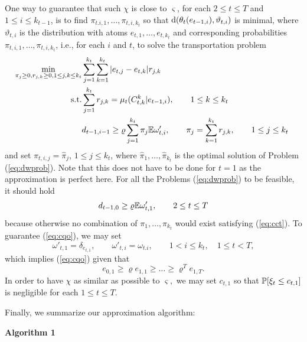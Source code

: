 \documentclass{article}              %
\begin{document}
One way to guarantee that such $\chi$ is close to $\varsigma$, for each $2\leq t \leq T$ and $1\leq i \leq k_{t-1}$, is to find $\pi_{t.i,1},\dots,\pi_{t,i,k_{t}}$  so that $\dw(\theta_{t}(e_{t-1,i}),\vartheta_{t,i})$
is minimal, where $\vartheta_{t,i}$ is the distribution with atoms
$e_{t,1},\dots,e_{t,k_{t}}$ and corresponding probabilities $\pi_{t,i,1},\dots,\pi_{t,i,k_{t}}$,
i.e., for each $i$ and $t$, to solve the transportation problem 
\begin{align}
\min_{\pi_{j}\geq0,r_{j,k}\geq0,1\leq j,k\leq k_{t}} & \sum_{j=1}^{k_{t}}\sum_{k=1}^{k_{t}}|e_{t,j}-e_{t,k}|r_{j,k}\label{eq:dwprob}\\
\text{s.t.} & \sum_{j=1}^{k_{t}}r_{j,k}=\mu_{t}(C_{t,k}^{k}|e_{t-1,i}),\qquad1\leq k\leq k_{t}\nonumber \\
 & d_{t-1,i-1}\geq\varrho\sum_{j=1}^{k_{t}}\pi_{j}\E\omega'_{t,i},\qquad \pi_{j}=\sum_{k=1}^{k_{t}}r_{j,k},\qquad1\leq j\leq k_{t}\text{ }\label{eq:cct}
\end{align}
and set $\pi_{t,i,j}=\hat \pi_j$, $1\leq j \leq k_t$, where $\hat \pi_1,\dots, \hat \pi_{k_t}$ is the optimal solution of Problem (\ref{eq:dwprob}). Note that this does not have to be done for $t=1$ as the approximation is perfect here. For all the Problems (\ref{eq:dwprob}) to be feasible,
it should hold 
\begin{equation}
d_{t-1,0}\geq\varrho\E\omega'_{t,1},\qquad2\leq t\leq T\label{eq:cqo}
\end{equation}
because otherwise no combination of $\pi_{1},\dots,\pi_{k_{t}}$
would exist satisfying (\ref{eq:cct}). To
guarantee (\ref{eq:cqo}), we may set
\begin{equation}
\omega'{}_{t,1}=\delta_{e_{t,1}},\qquad \omega'{}_{t,i}=\omega_{t.i},\qquad1<i\leq k_{t},\quad 1\leq t<T,\label{eq:dee}
\end{equation}
which implies (\ref{eq:cqo}) given that 
\begin{equation}
e_{0,1}\geq\varrho e_{1,1}\geq\dots\geq\varrho^{T}e_{1,T}.\label{eq:eeeee}
\end{equation}
In order to have $\chi$ as similar as possible to $\varsigma,$ we
may set $c_{t,1}$ so that $\P[\xi_{t}\leq c_{t,1}]$ is negligible
for each $1\leq t\leq T$.

Finally, we summarize our approximation algorithm:

\bigskip 

{\bf Algorithm 1}

\bigskip
\end{document}
